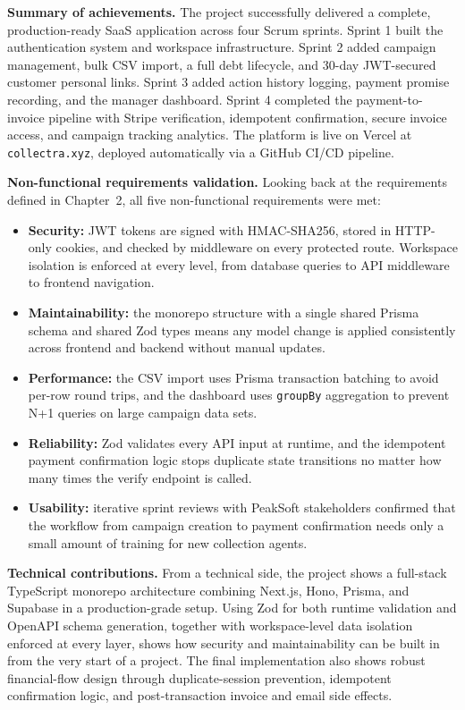 \documentclass[12pt,a4paper]{report}
\begin{document}
\textbf{Summary of achievements.}
The project successfully delivered a complete, production-ready SaaS application
across four Scrum sprints.
Sprint 1 built the authentication system and workspace infrastructure.
Sprint 2 added campaign management, bulk CSV import, a full debt lifecycle, and
30-day JWT-secured customer personal links.
Sprint 3 added action history logging, payment promise recording, and the manager
dashboard.
Sprint 4 completed the payment-to-invoice pipeline with Stripe verification,
idempotent confirmation, secure invoice access, and campaign tracking analytics.
The platform is live on Vercel at \texttt{collectra.xyz}, deployed automatically
via a GitHub CI/CD pipeline.

\textbf{Non-functional requirements validation.}
Looking back at the requirements defined in Chapter~2, all five non-functional
requirements were met:
\begin{itemize}
  \item \textbf{Security:} JWT tokens are signed with HMAC-SHA256, stored in
        HTTP-only cookies, and checked by middleware on every protected route.
        Workspace isolation is enforced at every level, from database queries to
        API middleware to frontend navigation.
  \item \textbf{Maintainability:} the monorepo structure with a single shared
        Prisma schema and shared Zod types means any model change is applied
        consistently across frontend and backend without manual updates.
  \item \textbf{Performance:} the CSV import uses Prisma transaction batching to
        avoid per-row round trips, and the dashboard uses \texttt{groupBy}
        aggregation to prevent N+1 queries on large campaign data sets.
  \item \textbf{Reliability:} Zod validates every API input at runtime, and the
        idempotent payment confirmation logic stops duplicate state transitions no
        matter how many times the verify endpoint is called.
  \item \textbf{Usability:} iterative sprint reviews with PeakSoft stakeholders
        confirmed that the workflow from campaign creation to payment confirmation
        needs only a small amount of training for new collection agents.
\end{itemize}

\textbf{Technical contributions.}
From a technical side, the project shows a full-stack TypeScript monorepo
architecture combining Next.js, Hono, Prisma, and Supabase in a production-grade
setup.
Using Zod for both runtime validation and OpenAPI schema generation, together with
workspace-level data isolation enforced at every layer, shows how security and
maintainability can be built in from the very start of a project.
The final implementation also shows robust financial-flow design through
duplicate-session prevention, idempotent confirmation logic, and post-transaction
invoice and email side effects.
\end{document}
